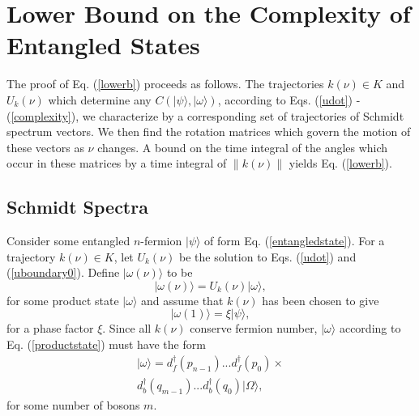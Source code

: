 \documentclass[twocolumn,amsmath,amssymb]{revtex4-1}
\begin{document}
\section{\label{app:lowerbound} Lower Bound on the Complexity of Entangled States}

The proof of Eq. (\ref{lowerb}) proceeds as follows. 
The trajectories $k(\nu) \in K$ and $U_k(\nu)$
which determine any $C( |\psi \rangle , |\omega \rangle )$, according to 
Eqs. (\ref{udot}) - (\ref{complexity}), we characterize 
by a corresponding
set of trajectories of Schmidt spectrum vectors. We then
find the rotation matrices which govern the motion of these vectors
as $\nu$ changes. A 
bound on the time integral of the angles which 
occur in these matrices by a time integral of $\parallel k(\nu) \parallel$ 
yields Eq. (\ref{lowerb}).

\subsection{\label{subsec:schmidtspectra} Schmidt Spectra}

Consider some entangled $n$-fermion $|\psi \rangle $ of form Eq. (\ref{entangledstate}).
For a trajectory $k(\nu) \in K$, let $U_k(\nu)$ be the solution to Eqs. (\ref{udot}) and (\ref{uboundary0}).
Define $|\omega(\nu) \rangle $ to be 
\begin{equation}
\label{omegaoft}
|\omega( \nu) \rangle  = U_k(\nu)|\omega \rangle ,
\end{equation}
for some product state $|\omega \rangle $
and assume that $k(\nu)$ has been chosen
to give
\begin{equation}
\label{upsiphi1}
|\omega(1) \rangle  = \xi |\psi \rangle , 
\end{equation}
for a phase factor $\xi$.
Since all $k(\nu)$ conserve fermion number, $|\omega \rangle $ according to
Eq. (\ref{productstate}) must have the form
\begin{multline}
\label{productstate1}
|\omega \rangle  = 
d_f^\dagger( p_{n-1}) ... d_f^\dagger( p_0) \times \\
d_b^\dagger( q_{m-1}) ... d_b^\dagger( q_0) |\Omega \rangle ,
\end{multline}
for some number of bosons $m$.
\end{document}
